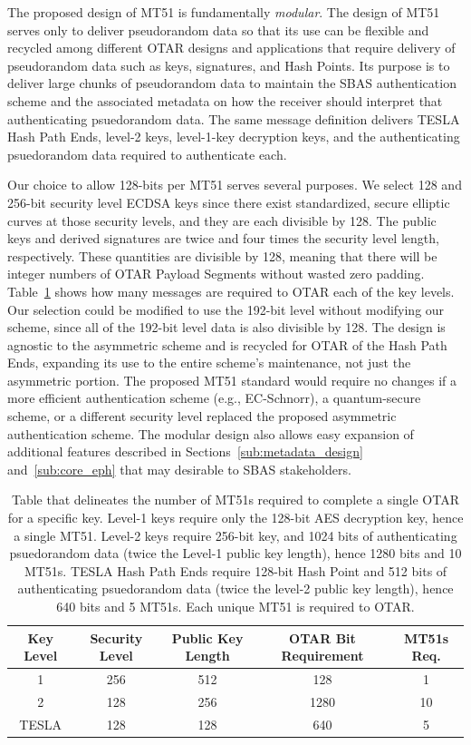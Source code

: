 \documentclass[letterpaper,times]{IONconf/IONconf}
\begin{document}
	The proposed design of MT51 is fundamentally {\em modular}.
	The design of MT51 serves only to deliver pseudorandom data so that its use can be flexible and recycled among different OTAR designs and applications that require delivery of pseudorandom data such as keys, signatures, and Hash Points. 
	Its purpose is to deliver large chunks of pseudorandom data to maintain the SBAS authentication scheme and the associated metadata on how the receiver should interpret that authenticating psuedorandom data.
	The same message definition delivers TESLA Hash Path Ends, level-2 keys, level-1-key decryption keys, and the authenticating psuedorandom data required to authenticate each.

	Our choice to allow 128-bits per MT51 serves several purposes.
	We select 128 and 256-bit security level ECDSA keys since there exist standardized, secure elliptic curves at those security levels, and they are each divisible by 128.
	The public keys and derived signatures are twice and four times the security level length, respectively.
	These quantities are divisible by 128, meaning that there will be integer numbers of OTAR Payload Segments without wasted zero padding.
	Table~\ref{tab: psuedorandom lengths} shows how many messages are required to OTAR each of the key levels.
	Our selection could be modified to use the 192-bit level without modifying our scheme, since all of the 192-bit level data is also divisible by 128.
	The design is agnostic to the asymmetric scheme and is recycled for OTAR of the Hash Path Ends, expanding its use to the entire scheme's maintenance, not just the asymmetric portion.
	The proposed MT51 standard would require no changes if a more efficient authentication scheme (e.g., EC-Schnorr), a quantum-secure scheme, or a different security level replaced the proposed asymmetric authentication scheme.
	The modular design also allows easy expansion of additional features described in Sections~\ref{sub:metadata_design} and~\ref{sub:core_eph} that may desirable to SBAS stakeholders.
		\begin{table}[H]
		\center
		\begin{tabular}{|c|c|c|c|c|} \hline
			Key Level & Security Level & Public Key Length & OTAR Bit Requirement & MT51s Req. \\ \hline
			    1 & 256 & 512 &  128 & 1 \\ \hline
			    2 & 128 & 256 & 1280 & 10\\ \hline
			TESLA & 128 & 128 &  640 & 5 \\ \hline
		\end{tabular}
		\caption{Table that delineates the number of MT51s required to complete a single OTAR for a specific key. Level-1 keys require only the 128-bit AES decryption key, hence a single MT51. Level-2 keys require 256-bit key, and 1024 bits of authenticating psuedorandom data (twice the Level-1 public key length), hence 1280 bits and 10 MT51s. TESLA Hash Path Ends require 128-bit Hash Point and 512 bits of authenticating psuedorandom data (twice the level-2 public key length), hence 640 bits and 5 MT51s. Each unique MT51 is required to OTAR.}
		\label{tab: psuedorandom lengths}
	\end{table}
\end{document}
